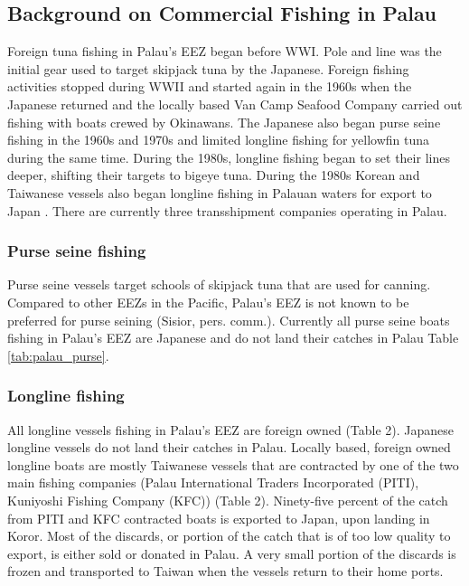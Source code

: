 \documentclass[9pttwoside,lineno]{pnas-new}
\begin{document}
\subsection{Background on Commercial Fishing in Palau}\label{Palau_back}

Foreign tuna fishing in Palau’s EEZ began before WWI. Pole and line was the initial gear used to target skipjack tuna by the Japanese. Foreign fishing activities stopped during WWII and started again in the 1960s when the Japanese returned and the locally based Van Camp Seafood Company carried out fishing with boats crewed by Okinawans. The Japanese also began purse seine fishing in the 1960s and 1970s and limited longline fishing for yellowfin tuna during the same time. During the 1980s, longline fishing began to set their lines deeper, shifting their targets to bigeye tuna. During the 1980s Korean and Taiwanese vessels also began longline fishing in Palauan waters for export to Japan \citep{chapman2000development}. There are currently three transshipment companies operating in Palau.

\subsubsection{Purse seine fishing}

Purse seine vessels target schools of skipjack tuna that are used for canning. Compared to other EEZs in the Pacific, Palau’s EEZ is not known to be preferred for purse seining (Sisior, pers. comm.). Currently all purse seine boats fishing in Palau’s EEZ are Japanese and do not land their catches in Palau Table \ref{tab:palau_purse}. 

%

\subsubsection{Longline fishing}

All longline vessels fishing in Palau’s EEZ are foreign owned (Table 2). Japanese longline vessels do not land their catches in Palau. Locally based, foreign owned longline boats are mostly Taiwanese vessels that are contracted by one of the two main fishing companies (Palau International Traders Incorporated (PITI), Kuniyoshi Fishing Company (KFC)) (Table 2). Ninety-five percent of the catch from PITI and KFC contracted boats is exported to Japan, upon landing in Koror. Most of the discards, or portion of the catch that is of too low quality to export, is either sold or donated in Palau. A very small portion of the discards is frozen and transported to Taiwan when the vessels return to their home ports.
\end{document}
